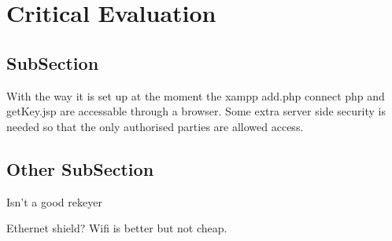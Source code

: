 \chapter{Critical Evaluation}
\label{crit}




\section{SubSection}

With the way it is set up at the moment the xampp add.php connect php and getKey.jsp are accessable through a browser. Some extra server side security is needed so that the only authorised parties are allowed access. 

\section{Other SubSection}

Isn't a good rekeyer

Ethernet shield? Wifi is better but not cheap.




